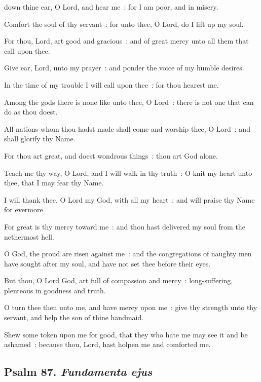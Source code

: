  down thine ear, O Lord, and hear me~: for I am poor, and in misery.\par
{}
Comfort the soul of thy servant~: for unto thee, O Lord, do I lift up my soul.\par
{}For thou, Lord, art good and gracious~: and of great mercy unto all them that call upon thee.\par
{}Give ear, Lord, unto my prayer~: and ponder the voice of my humble desires.\par
{}In the time of my trouble I will call upon thee~: for thou hearest me.\par
{}Among the gods there is none like unto thee, O Lord~: there is not one that can do as thou doest.\par
{}All nations whom thou hadst made shall come and worship thee, O Lord~: and shall glorify thy Name.\par
{}For thou art great, and doest wondrous things~: thou art God alone.\par
{}Teach me thy way, O Lord, and I will walk in thy truth~: O knit my heart unto thee, that I may fear thy Name.\par
{}I will thank thee, O Lord my God, with all my heart~: and will praise thy Name for evermore.\par
{}For great is thy mercy toward me~: and thou hast delivered my soul from the nethermost hell.\par
{}O God, the proud are risen against me~: and the congregations of naughty men have sought after my soul, and have not set thee before their eyes.\par
{}But thou, O Lord God, art full of compassion and mercy~: long-suffering, plenteous in goodness and truth.\par
{}O turn thee then unto me, and have mercy upon me~: give thy strength unto thy servant, and help the son of thine handmaid.\par
{}Shew some token upon me for good, that they who hate me may see it and be ashamed~: because thou, Lord, hast holpen me and comforted me.\par

\clearpage
\subsection{Psalm 87. \textit{Fundamenta ejus}}

